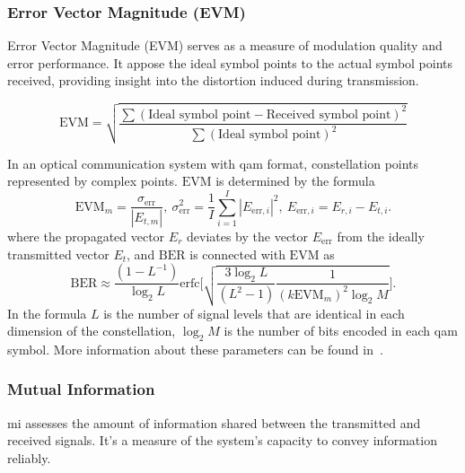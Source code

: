 \subsubsection{Error Vector Magnitude (EVM)}
Error Vector Magnitude (EVM) serves as a measure of modulation quality and error performance. It appose the ideal symbol points to the actual symbol points received, providing insight into the distortion induced during transmission.

\begin{equation}
\text{EVM} = \sqrt{\frac{\sum \left(\text{Ideal symbol point} - \text{Received symbol point}\right)^2}{\sum \left(\text{Ideal symbol point}\right)^2}}
\end{equation}

In an optical communication system with \Gls{qam} format, constellation points represented by complex points. $\mathrm{EVM}$ is determined by the formula
\begin{equation}
    \mathrm{EVM}_{m} = \frac{\sigma_{\mathrm{err}}}{|E_{t,m}|} {,} \
    \sigma_{\mathrm{err}}^2 = \frac{1}{I} \sum_{i=1}^{I} |E_{\mathrm{err},i}|^2 {,} \
    E_{\mathrm{err},i} = E_{r,i} - E_{t,i} {.}
\end{equation}
where the propagated vector $E_{r}$ deviates by the vector $E_{\mathrm{err}}$ from the ideally transmitted vector $E_{t}$, and $\mathrm{BER}$ is connected with $\mathrm{EVM}$ as
\begin{equation}
    \mathrm{BER} \approx \frac{(1 - L^{-1})}{\log_2 L}
        \mathrm{erfc}\bigg[ \sqrt{\frac{3 \log_2 L}{(L^2 - 1)} 
        \frac{1}{(k \mathrm{EVM}_{m})^2 \log_2 M}} \bigg] {.}
\end{equation}
In the formula $L$ is the number of signal levels that are identical in each dimension of the constellation, $\log_2 M$ is the number of bits encoded in each \Gls{qam} symbol. More information about these parameters can be found in~\cite{schmogrow}.



\subsubsection{Mutual Information}
\gls{mi} assesses the amount of information shared between the transmitted and received signals. It's a measure of the system's capacity to convey information reliably.

